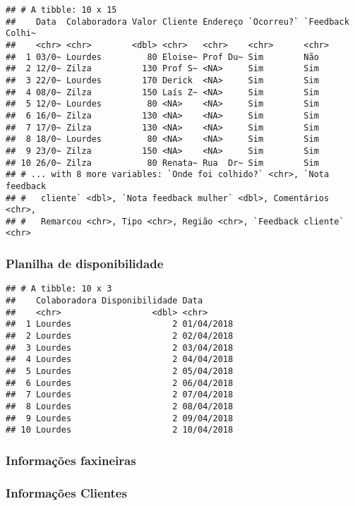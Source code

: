 \documentclass[
]{article}
\begin{document}
\begin{verbatim}
## # A tibble: 10 x 15
##    Data  Colaboradora Valor Cliente Endereço `Ocorreu?` `Feedback Colhi~
##    <chr> <chr>        <dbl> <chr>   <chr>    <chr>      <chr>           
##  1 03/0~ Lourdes         80 Eloise~ Prof Du~ Sim        Não             
##  2 12/0~ Zilza          130 Prof S~ <NA>     Sim        Sim             
##  3 22/0~ Lourdes        170 Derick  <NA>     Sim        Sim             
##  4 08/0~ Zilza          150 Laís Z~ <NA>     Sim        Sim             
##  5 12/0~ Lourdes         80 <NA>    <NA>     Sim        Sim             
##  6 16/0~ Zilza          130 <NA>    <NA>     Sim        Sim             
##  7 17/0~ Zilza          130 <NA>    <NA>     Sim        Sim             
##  8 18/0~ Lourdes         80 <NA>    <NA>     Sim        Sim             
##  9 23/0~ Zilza          150 <NA>    <NA>     Sim        Sim             
## 10 26/0~ Zilza           80 Renata~ Rua  Dr~ Sim        Sim             
## # ... with 8 more variables: `Onde foi colhido?` <chr>, `Nota feedback
## #   cliente` <dbl>, `Nota feedback mulher` <dbl>, Comentários <chr>,
## #   Remarcou <chr>, Tipo <chr>, Região <chr>, `Feedback cliente` <chr>
\end{verbatim}

\hypertarget{planilha-de-disponibilidade}{%
\subsubsection{Planilha de
disponibilidade}\label{planilha-de-disponibilidade}}

\begin{verbatim}
## # A tibble: 10 x 3
##    Colaboradora Disponibilidade Data      
##    <chr>                  <dbl> <chr>     
##  1 Lourdes                    2 01/04/2018
##  2 Lourdes                    2 02/04/2018
##  3 Lourdes                    2 03/04/2018
##  4 Lourdes                    2 04/04/2018
##  5 Lourdes                    2 05/04/2018
##  6 Lourdes                    2 06/04/2018
##  7 Lourdes                    2 07/04/2018
##  8 Lourdes                    2 08/04/2018
##  9 Lourdes                    2 09/04/2018
## 10 Lourdes                    2 10/04/2018
\end{verbatim}

\hypertarget{informauxe7uxf5es-faxineiras}{%
\subsubsection{Informações
faxineiras}\label{informauxe7uxf5es-faxineiras}}

\hypertarget{informauxe7uxf5es-clientes}{%
\subsubsection{Informações Clientes}\label{informauxe7uxf5es-clientes}}
\end{document}
